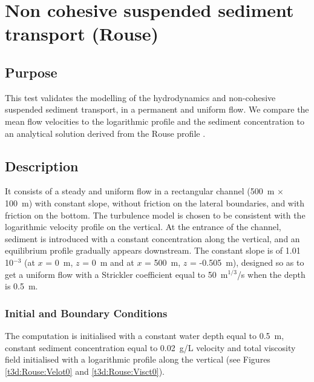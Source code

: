 \chapter{Non cohesive suspended sediment transport (Rouse)}

\section{Purpose}

This test validates the modelling of the hydrodynamics and non-cohesive
suspended sediment transport, in a permanent and uniform flow.
We compare the mean flow velocities to the logarithmic profile and the
sediment concentration to an analytical solution derived from the Rouse
profile \cite{HervouetVillaret_2004}.

\section{Description}

It consists of a steady and uniform flow in a rectangular channel
(500~m $\times$ 100~m) with constant slope, without friction on the
lateral boundaries, and with friction on the bottom.
The turbulence model is chosen to be consistent with the logarithmic
velocity profile on the vertical.
At the entrance of the channel, sediment is introduced with a constant
concentration along the vertical, and an equilibrium profile gradually
appears downstream.
The constant slope is of 1.01 10$^{-3}$ (at $x$ = 0~m, $z$ = 0~m and at
$x$ = 500~m, $z$ = -0.505~m),
designed so as to get a uniform flow with a Strickler coefficient equal
to 50~m$^{1/3}$/s when the depth is 0.5~m.


\subsection{Initial and Boundary Conditions}

The computation is initialised with a constant water depth equal to 0.5~m,
constant sediment concentration equal to 0.02~g/L
velocity and total viscosity field initialised with a logarithmic
profile along the vertical (see Figures \ref{t3d:Rouse:Velot0} and
\ref{t3d:Rouse:Visct0}).

